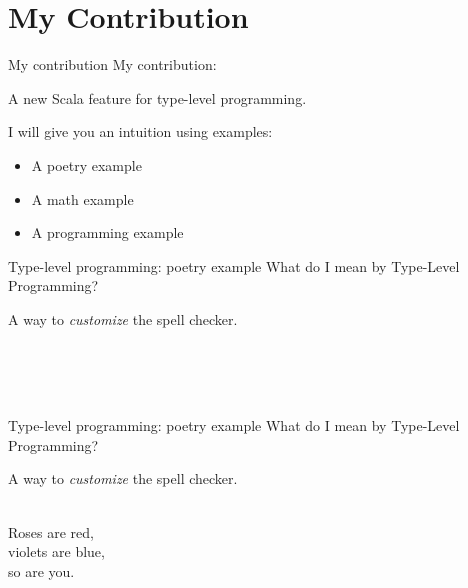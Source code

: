 \documentclass[10pt]{beamer}
\newenvironment{slide}[2][]
  {\begin{frame}[fragile,environment=slide,#1]{#2}}
  {\end{frame}}
\begin{document}
\section{My Contribution}

\begin{slide}{My contribution}
\Large
My contribution:

A new Scala feature for type-level programming.

I will give you an intuition using examples:

\begin{itemize}
  \item A poetry example
  \item A math example
  \item A programming example
\end{itemize}
\end{slide}

\begin{slide}{Type-level programming: poetry example}
\Large
What do I mean by Type-Level Programming?

A way to \emph{customize} the spell checker.

\begin{center}
\hspace{20pt}
\begin{minipage}{0.45\textwidth}%
\phantom{-- en alexandrin}\\
\phantom{Roses are red,}\\
\phantom{violets are blue,}\\
\phantom{so are you.}
\end{minipage}
\end{center}
\end{slide}

\begin{slide}{Type-level programming: poetry example}
\Large
What do I mean by Type-Level Programming?

A way to \emph{customize} the spell checker.

\begin{center}
\hspace{20pt}
\begin{minipage}{0.45\textwidth}%
\phantom{-- en alexandrin}\\
Roses are red,\\
violets are blue,\\
so are you.
\end{minipage}
\end{center}
\end{slide}
\end{document}
